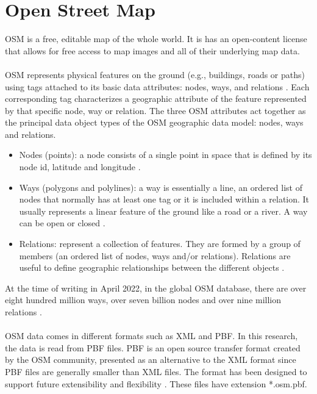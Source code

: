 


\section{Open Street Map}\label{sec:osm}
\ac{OSM} is a free, editable map of the whole world. It is has an open-content license \cite{osm2} that allows for free access to map images and all of their underlying map data.
\\
\\
\ac{OSM} represents physical features on the ground (e.g., buildings, roads or paths) using tags attached to its basic data attributes: nodes, ways, and relations \cite{osm1}. Each corresponding tag characterizes a geographic attribute of the feature represented by that specific node, way or relation.
The three \ac{OSM} attributes act together as the principal data object types of the \ac{OSM} geographic data model: nodes, ways and relations.
\begin{itemize}
    \item Nodes (points): a node consists of a single point in space that is defined by its node id, latitude and longitude \cite{node}. 
    \item Ways (polygons and polylines): a way is essentially a line, an ordered list of nodes that normally has at least one tag or it is included within a relation. It usually represents a linear feature of the ground like a road or a river. A way can be open or closed \cite{way}.
    \item Relations: represent a collection of features. They are formed by a group of members (an ordered list of nodes, ways and/or relations). Relations are useful to define geographic relationships between the different objects \cite{relation}.
\end{itemize}
At the time of writing in April 2022, in the global \ac{OSM} database, there are over eight hundred million ways, over seven billion nodes and over nine million relations \cite{osm3}.
\\
\\
\ac{OSM} data comes in different formats such as \ac{XML} and \ac{PBF}. In this research, the data is read from \ac{PBF} files. \ac{PBF} is an open source transfer format created by the \ac{OSM} community, presented as an alternative to the XML format since \ac{PBF} files are generally smaller than \ac{XML} files. The format has been designed to support future extensibility and flexibility \cite{pbf}. These files have extension *.osm.pbf.

